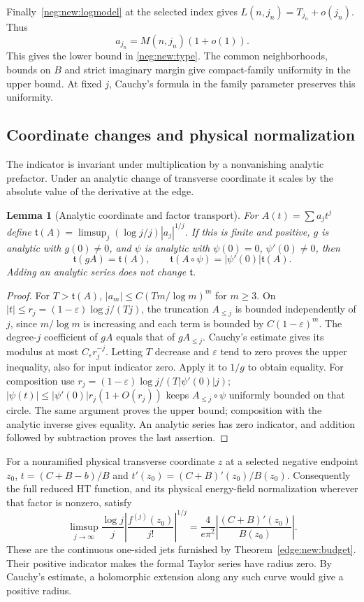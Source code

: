 \documentclass[11pt]{article}
\numberwithin{equation}{section}
\newtheorem{lemma}[theorem]{Lemma}
\theoremstyle{definition}
\begin{document}
Finally~\eqref{neg:new:logmodel}
at the selected index gives $L(n,j_n)=T_{j_n}+o(j_n)$.  Thus
\[
                        a_{j_n}=M(n,j_n)(1+o(1)).
\]
This gives the lower bound in \eqref{neg:new:type}. The common
neighborhoods, bounds on $B$ and strict imaginary margin give
compact-family uniformity in the upper bound. At fixed $j$, Cauchy's
formula in the family parameter preserves this uniformity.

\subsection{Coordinate changes and physical normalization}

The indicator is invariant under multiplication by a nonvanishing
analytic prefactor. Under an analytic change of transverse coordinate
it scales by the absolute value of the derivative at the edge.

\begin{lemma}[Analytic coordinate and factor transport]
\label{neg:new:transport}
For $A(t)=\sum a_jt^j$ define
$\mathfrak t(A)=\limsup_j(\log j/j)|a_j|^{1/j}$.
If this is finite and positive, $g$ is analytic with $g(0)\ne0$,
and $\psi$ is analytic with $\psi(0)=0$, $\psi'(0)\ne0$, then
\[
 \mathfrak t(gA)=\mathfrak t(A),\qquad
 \mathfrak t(A\circ\psi)=|\psi'(0)|\mathfrak t(A).
\]
Adding an analytic series does not change $\mathfrak t$.
\end{lemma}
\begin{proof}
For $T>\mathfrak t(A)$, $|a_m|\le C(Tm/\log m)^m$ for $m\ge3$.
On $|t|\le r_j=(1-\varepsilon)\log j/(Tj)$, the truncation
$A_{\le j}$ is bounded independently of $j$, since $m/\log m$ is
increasing and each term is bounded by $C(1-\varepsilon)^m$.
The degree-$j$ coefficient of $gA$ equals that of $gA_{\le j}$.
Cauchy's estimate gives its modulus at most $C_\varepsilon r_j^{-j}$.
Letting $T$ decrease and $\varepsilon$ tend to zero proves the upper
inequality, also for input indicator zero.  Apply it to $1/g$ to
obtain equality.  For composition use
$r_j=(1-\varepsilon)\log j/(T|\psi'(0)|j)$;
$|\psi(t)|\le|\psi'(0)|r_j(1+O(r_j))$ keeps
$A_{\le j}\circ\psi$ uniformly bounded on that circle.  The same
argument proves the upper bound; composition with the analytic inverse
gives equality.  An analytic series has zero indicator, and addition
followed by subtraction proves the last assertion.
\end{proof}

For a nonramified physical transverse coordinate $z$ at a
selected negative endpoint $z_0$,
$t=(C+B-b)/B$ and $t'(z_0)=(C+B)'(z_0)/B(z_0)$.
Consequently the full reduced HT function, and its physical energy-field
normalization wherever that factor is nonzero, satisfy
\[
 \limsup_{j\to\infty}\frac{\log j}{j}
 \left|\frac{f^{(j)}(z_0)}{j!}\right|^{1/j}
 =\frac4{e\pi^2}\left|\frac{(C+B)'(z_0)}{B(z_0)}\right|.
\]
These are the continuous one-sided jets furnished by
Theorem~\ref{edge:new:budget}.  Their positive indicator makes the
formal Taylor series have radius zero. By Cauchy's estimate, a
holomorphic extension along any such curve would give a positive radius.
\end{document}
